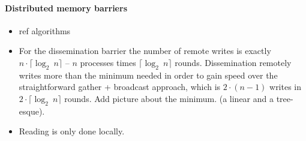 \documentclass[a4paper, 10pt]{article}
\begin{document}
\paragraph{Distributed memory barriers}
\label{sssec:analysis-general-distributed}
\begin{itemize}
	\item ref algorithms
	\item For the dissemination barrier the number of remote writes is exactly $n \cdot \lceil \log _2~n \rceil$ -- $n$ processes times $\lceil \log _2~n \rceil$ rounds. Dissemination remotely writes more than the minimum needed in order to gain speed over the straightforward gather + broadcast approach, which is $2 \cdot (n-1)$ writes in $2 \cdot  \lceil \log _2~n \rceil$ rounds. Add picture about the minimum. (a linear and a tree-esque).
	\item Reading is only done locally.



\end{itemize}
\end{document}
